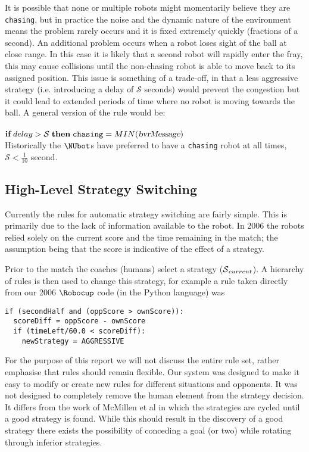It is possible that none or multiple robots might momentarily
believe they are \texttt{chasing}, but in practice the noise and the
dynamic nature of the environment means the problem rarely occurs
and it is fixed extremely quickly (fractions of a second). An
additional problem occurs when a robot loses sight of the ball at
close range. In this case it is likely that a second robot will
rapidly enter the fray, this may cause collisions until the
non-chasing robot is able to move back to its assigned position.
This issue is something of a trade-off, in that a less aggressive
strategy (i.e. introducing a delay of $\mathcal{S}$ seconds) would prevent the congestion but it could lead to extended periods of time where no robot is moving towards
the ball. A general version of the rule would be: \\\\
$\textbf{if}\;delay>\mathcal{S}\;\textbf{then}\;\texttt{chasing}=MIN({\distance})$\\

Historically the $\NUbot$s have preferred to have a \texttt{chasing} robot
at all times, $\mathcal{S}<\frac{1}{10}$ second.

\subsection{High-Level Strategy Switching}
\label{subsec:strategies}

Currently the rules for automatic strategy switching are fairly
simple. This is primarily due to the lack of information available
to the robot. In 2006 the robots relied solely on the current score and the time
remaining in the match; the assumption being that the score is indicative of the effect of a strategy.

Prior to the match the coaches (humans) select a strategy
($\Highlevel_{current}$). A hierarchy of rules is then used to change
this strategy, for example a rule taken directly from our 2006
$\Robocup$ code (in the Python language) was

\begin{verbatim}
if (secondHalf and (oppScore > ownScore)):
  scoreDiff = oppScore - ownScore
  if (timeLeft/60.0 < scoreDiff):
    newStrategy = AGGRESSIVE
\end{verbatim}

For the purpose of this report we will not discuss the entire rule
set, rather emphasise that rules should remain flexible. Our system
was designed to make it easy to modify or create new rules for
different situations and opponents. It was not designed to
completely remove the human element from the strategy decision. It
differs from the work of McMillen et al \cite{McMillen06switch} in
which the strategies are cycled until a good strategy is found.
While this should result in the discovery of a good strategy there
exists the possibility of conceding a goal (or two) while rotating
through inferior strategies.

